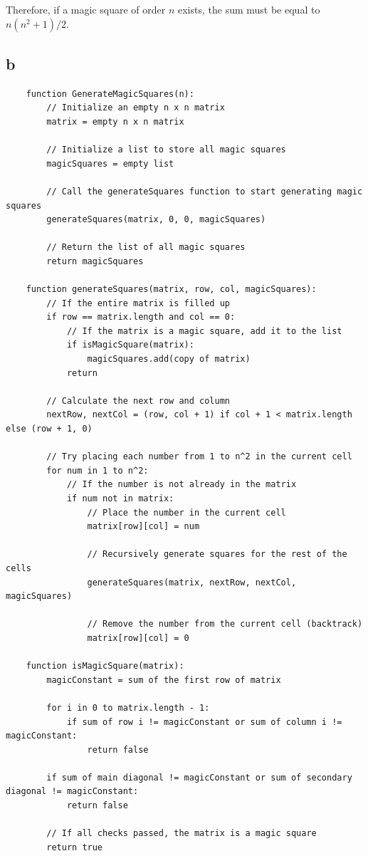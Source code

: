 \documentclass{article}
\begin{document}
Therefore, if a magic square of order \( n \) exists, the sum must be equal to \( n(n^2 + 1)/2 \).

\subsection*{b}
\begin{verbatim}
    function GenerateMagicSquares(n):
        // Initialize an empty n x n matrix
        matrix = empty n x n matrix
    
        // Initialize a list to store all magic squares
        magicSquares = empty list
    
        // Call the generateSquares function to start generating magic squares
        generateSquares(matrix, 0, 0, magicSquares)
    
        // Return the list of all magic squares
        return magicSquares
    
    function generateSquares(matrix, row, col, magicSquares):
        // If the entire matrix is filled up
        if row == matrix.length and col == 0:
            // If the matrix is a magic square, add it to the list
            if isMagicSquare(matrix):
                magicSquares.add(copy of matrix)
            return
    
        // Calculate the next row and column
        nextRow, nextCol = (row, col + 1) if col + 1 < matrix.length else (row + 1, 0)
    
        // Try placing each number from 1 to n^2 in the current cell
        for num in 1 to n^2:
            // If the number is not already in the matrix
            if num not in matrix:
                // Place the number in the current cell
                matrix[row][col] = num
    
                // Recursively generate squares for the rest of the cells
                generateSquares(matrix, nextRow, nextCol, magicSquares)
    
                // Remove the number from the current cell (backtrack)
                matrix[row][col] = 0
    
    function isMagicSquare(matrix):
        magicConstant = sum of the first row of matrix
    
        for i in 0 to matrix.length - 1:
            if sum of row i != magicConstant or sum of column i != magicConstant:
                return false
    
        if sum of main diagonal != magicConstant or sum of secondary diagonal != magicConstant:
            return false
    
        // If all checks passed, the matrix is a magic square
        return true
    \end{verbatim}
\end{document}
